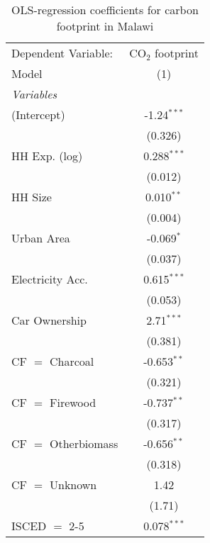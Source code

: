 
\begin{table}[htbp!]
   \centering
   \small
   \begin{adjustbox}{width = 1\textwidth, max height = 0.95\textheight, center}
      \begin{threeparttable}[b]
         \caption{\label{tab:OLS_2_MWI} OLS-regression coefficients for carbon footprint in Malawi}
         \begin{tabular}{lc}
            \tabularnewline \midrule \midrule
            Dependent Variable: & CO$_{2}$ footprint\\  
            Model               & (1)\\  
            \midrule
            \emph{Variables}\\
            (Intercept)         & -1.24$^{***}$\\   
                                & (0.326)\\   
            HH Exp. (log)       & 0.288$^{***}$\\   
                                & (0.012)\\   
            HH Size             & 0.010$^{**}$\\   
                                & (0.004)\\   
            Urban Area          & -0.069$^{*}$\\   
                                & (0.037)\\   
            Electricity Acc.    & 0.615$^{***}$\\   
                                & (0.053)\\   
            Car Ownership       & 2.71$^{***}$\\   
                                & (0.381)\\   
            CF $=$ Charcoal     & -0.653$^{**}$\\   
                                & (0.321)\\   
            CF $=$ Firewood     & -0.737$^{**}$\\   
                                & (0.317)\\   
            CF $=$ Otherbiomass & -0.656$^{**}$\\   
                                & (0.318)\\   
            CF $=$ Unknown      & 1.42\\   
                                & (1.71)\\   
            ISCED $=$ 2-5       & 0.078$^{***}$\\   

\end{tabular}
\end{threeparttable}
\end{adjustbox}
\end{table}
